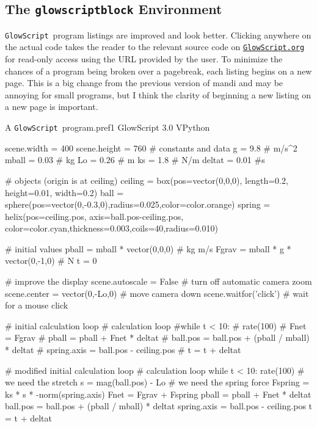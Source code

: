 \documentclass{article}
\newcommand*{\pkg}[1]{\textsf{#1}}                    %
\newcommand*{\GlowScript}{\texttt{GlowScript}}        %
\newcommand*{\GlowScriptorg}{\texttt{GlowScript.org}} %
\begin{document}
\subsection{The \texttt{glowscriptblock} Environment}
\GlowScript\ program listings are improved and look better. Clicking anywhere on the actual 
code takes the reader to the relevant source code on \href{https://www.glowscript.org}{\GlowScriptorg}
for read-only access using the URL provided by the user. To minimize the chances of a program being 
broken over a pagebreak, each listing begins on a new page. This is a big change from the previous 
version of \pkg{mandi} and may be annoying for small programs, but I think the clarity of beginning a
new listing on a new page is important.
\begin{glowscriptblock}{A \GlowScript\ program.}{pref1}
GlowScript 3.0 VPython

scene.width = 400
scene.height = 760
# constants and data
g = 9.8       # m/s^2
mball = 0.03  # kg
Lo = 0.26     # m
ks = 1.8      # N/m
deltat = 0.01 #s 

# objects (origin is at ceiling)
ceiling = box(pos=vector(0,0,0), length=0.2, height=0.01, width=0.2)
ball = sphere(pos=vector(0,-0.3,0),radius=0.025,color=color.orange)
spring = helix(pos=ceiling.pos, axis=ball.pos-ceiling.pos,
         color=color.cyan,thickness=0.003,coils=40,radius=0.010)

# initial values
pball = mball * vector(0,0,0)      # kg m/s
Fgrav = mball * g * vector(0,-1,0) # N
t = 0

# improve the display
scene.autoscale = False        # turn off automatic camera zoom
scene.center = vector(0,-Lo,0) # move camera down
scene.waitfor('click')         # wait for a mouse click

# initial calculation loop
# calculation loop
#while t < 10:
#    rate(100)
#    Fnet = Fgrav
#    pball = pball + Fnet * deltat
#    ball.pos = ball.pos + (pball / mball) * deltat
#    spring.axis = ball.pos - ceiling.pos
#    t = t + deltat
    
# modified initial calculation loop
# calculation loop
while t < 10:
    rate(100)
    # we need the stretch
    s = mag(ball.pos) - Lo
    # we need the spring force
    Fspring = ks * s * -norm(spring.axis)
    Fnet = Fgrav + Fspring
    pball = pball + Fnet * deltat
    ball.pos = ball.pos + (pball / mball) * deltat
    spring.axis = ball.pos - ceiling.pos
    t = t + deltat
\end{glowscriptblock}
\end{document}
